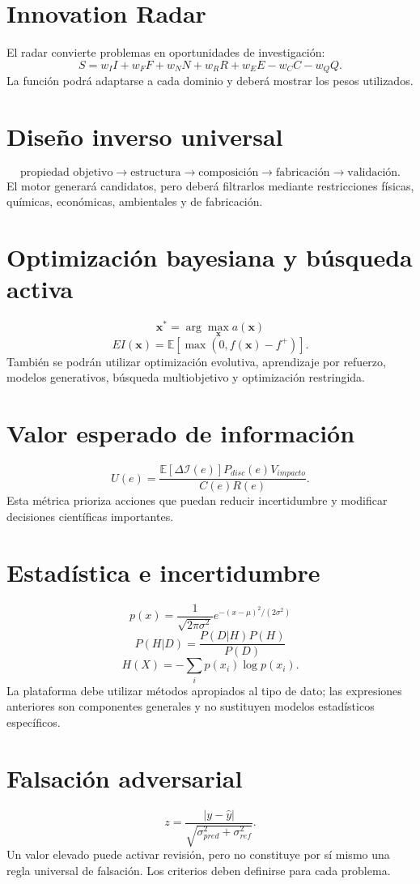 \documentclass[11pt,a4paper]{article}
\begin{document}
\section{Innovation Radar}
El radar convierte problemas en oportunidades de investigación:
\[
S=w_I I+w_FF+w_NN+w_RR+w_EE-w_CC-w_QQ.
\]
La función podrá adaptarse a cada dominio y deberá mostrar los pesos utilizados.

\section{Diseño inverso universal}
\[
\text{propiedad objetivo}\rightarrow\text{estructura}\rightarrow\text{composición}\rightarrow\text{fabricación}\rightarrow\text{validación}.
\]
El motor generará candidatos, pero deberá filtrarlos mediante restricciones físicas, químicas, económicas, ambientales y de fabricación.

\section{Optimización bayesiana y búsqueda activa}
\[
\mathbf x^*=\arg\max_\mathbf x a(\mathbf x)
\]
\[
EI(\mathbf x)=\mathbb E[\max(0,f(\mathbf x)-f^+)].
\]
También se podrán utilizar optimización evolutiva, aprendizaje por refuerzo, modelos generativos, búsqueda multiobjetivo y optimización restringida.

\section{Valor esperado de información}
\[
U(e)=\frac{\mathbb E[\Delta\mathcal I(e)]P_{disc}(e)V_{impacto}}{C(e)R(e)}.
\]
Esta métrica prioriza acciones que puedan reducir incertidumbre y modificar decisiones científicas importantes.

\section{Estadística e incertidumbre}
\[
p(x)=\frac{1}{\sqrt{2\pi\sigma^2}}e^{-(x-\mu)^2/(2\sigma^2)}
\]
\[
P(H|D)=\frac{P(D|H)P(H)}{P(D)}
\]
\[
H(X)=-\sum_i p(x_i)\log p(x_i).
\]
La plataforma debe utilizar métodos apropiados al tipo de dato; las expresiones anteriores son componentes generales y no sustituyen modelos estadísticos específicos.

\section{Falsación adversarial}
\[
z=\frac{|y-\hat y|}{\sqrt{\sigma_{pred}^2+\sigma_{ref}^2}}.
\]
Un valor elevado puede activar revisión, pero no constituye por sí mismo una regla universal de falsación. Los criterios deben definirse para cada problema.
\end{document}
